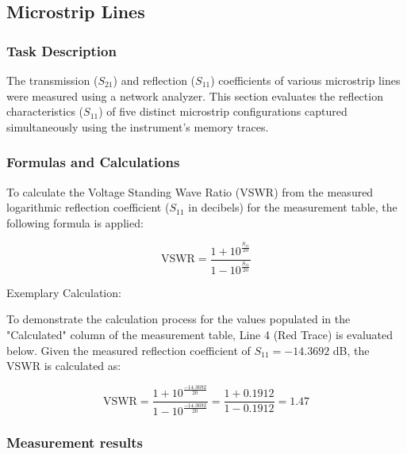 \subsection{Microstrip Lines}

\subsubsection{Task Description}
The transmission ($S_{21}$) and reflection ($S_{11}$) coefficients of various microstrip lines were measured using a network analyzer. This section evaluates the reflection characteristics ($S_{11}$) of five distinct microstrip configurations captured simultaneously using the instrument's memory traces.

\subsubsection{Formulas and Calculations}

To calculate the Voltage Standing Wave Ratio (VSWR) from the measured logarithmic reflection coefficient ($S_{11}$ in decibels) for the measurement table, the following formula is applied:

\begin{equation}
    \text{VSWR} = \frac{1 + 10^{\frac{S_{11}}{20}}}{1 - 10^{\frac{S_{11}}{20}}}
\end{equation}

Exemplary Calculation:

To demonstrate the calculation process for the values populated in the "Calculated" column of the measurement table, Line 4 (Red Trace) is evaluated below. Given the measured reflection coefficient of $S_{11} = -14.3692$ dB, the VSWR is calculated as:

\begin{equation}
    \text{VSWR} = \frac{1 + 10^{\frac{-14.3692}{20}}}{1 - 10^{\frac{-14.3692}{20}}} = \frac{1 + 0.1912}{1 - 0.1912} = 1.47
\end{equation}

\subsubsection{Measurement results}

